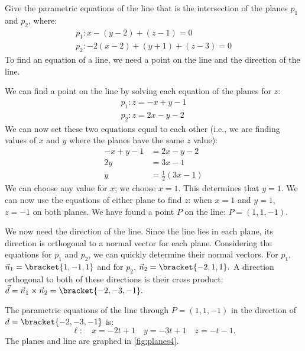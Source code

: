 \begin{example}\label{ex_planes4}
Give the parametric equations of the line that is the intersection of the planes $p_1$ and $p_2$, where:
\begin{gather*}
p_1: x-(y-2)+(z-1) =0 \\
p_2: -2(x-2)+(y+1)+(z-3)=0
\end{gather*}
\solution
To find an equation of a line, we need a point on the line and the direction of the line. 

We can find a point on the line by solving each equation of the planes for $z$:
\begin{gather*}
p_1: z = -x+y-1 \\
p_2: z = 2x-y-2
\end{gather*}
We can now set these two equations equal to each other (i.e., we are finding values of $x$ and $y$ where the planes have the same $z$ value):
\begin{align*}
-x+y-1 &= 2x-y-2 \\
2y &= 3x-1\\
y &= \frac12(3x-1)
\end{align*}
We can choose any value for $x$; we choose $x=1$. This determines that $y=1$. We can now use the equations of either plane to find $z$: when $x=1$ and $y=1$, $z=-1$ on both planes. We have found a point $P$  on the line: $P= (1,1,-1)$. 

We now need the direction of the line. Since the line lies in each plane, its direction is orthogonal to a normal vector for each plane. Considering the equations for $p_1$ and $p_2$, we can quickly determine their normal vectors. For $p_1$, $\vec n_1 =\bracket{1,-1,1}$ and for $p_2$, $\vec n_2 =\bracket{-2,1,1}.$ A direction orthogonal to both of these directions is their cross product: $\vec d = \vec n_1\times \vec n_2 =\bracket{-2,-3,-1}.$


The parametric equations of the line through $P=(1,1,-1)$ in the direction of $d=\bracket{-2,-3,-1}$ is:
\[\ell: \quad x= -2t+1\quad y = -3t+1\quad z=-t-1.\]
The planes and line are graphed in \autoref{fig:planes4}.
\end{example}

